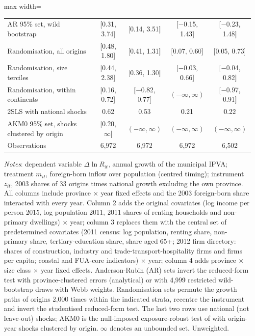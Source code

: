 \begin{table}[!htbp]
\begin{adjustbox}{max width=\linewidth}
\begin{tabular}{lcccc}
AR 95\% set, wild bootstrap & [0.31, 3.74] & [0.14, 3.51] & [$-$0.15, 1.43] & [$-$0.23, 1.48] \\
Randomisation, all origins & [0.48, 1.80] & [0.41, 1.31] & [0.07, 0.60] & [0.05, 0.73] \\
Randomisation, size terciles & [0.44, 2.38] & [0.36, 1.30] & [$-$0.03, 0.66] & [$-$0.04, 0.82] \\
Randomisation, within continents & [0.16, 0.72] & [$-$0.82, 0.77] & $(-\infty,\infty)$ & [$-$0.97, 0.91] \\
2SLS with national shocks & 0.62 & 0.53 & 0.21 & 0.22 \\
AKM0 95\% set, shocks clustered by origin & [0.20, $\infty$] & $(-\infty,\infty)$ & $(-\infty,\infty)$ & $(-\infty,\infty)$ \\
Observations & 6,972 & 6,972 & 6,972 & 6,502 \\
\bottomrule
\end{tabular}\end{adjustbox}
\begin{minipage}{0.97\linewidth}\footnotesize\vspace{4pt}
\textit{Notes}: dependent variable $\Delta\ln R_{it}$, annual growth of the municipal IPVA; treatment $m_{it}$, foreign-born inflow over population (centred timing); instrument $z_{it}$, 2003 shares of 33 origins times national growth excluding the own province. All columns include province $\times$ year fixed effects and the 2003 foreign-born share interacted with every year. Column 2 adds the original covariates (log income per person 2015, log population 2011, 2011 shares of renting households and non-primary dwellings) $\times$ year; column 3 replaces them with the central set of predetermined covariates (2011 census: log population, renting share, non-primary share, tertiary-education share, share aged 65+; 2012 firm directory: shares of construction, industry and trade-transport-hospitality firms and firms per capita; coastal and FUA-core indicators) $\times$ year; column 4 adds province $\times$ size class $\times$ year fixed effects. Anderson-Rubin (AR) sets invert the reduced-form test with province-clustered errors (analytical) or with 4,999 restricted wild-bootstrap draws with Webb weights. Randomisation sets permute the growth paths of origins 2,000 times within the indicated strata, recentre the instrument and invert the studentised reduced-form test. The last two rows use national (not leave-out) shocks; AKM0 is the null-imposed exposure-robust test of \citet{adao2019} with origin-year shocks clustered by origin. $\infty$ denotes an unbounded set. Unweighted.
\end{minipage}\end{table}